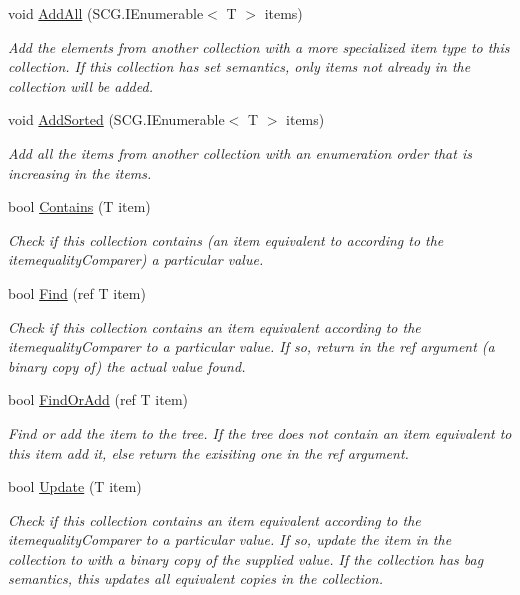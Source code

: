 \begin{DoxyCompactItemize}
void \hyperlink{class_c5_1_1_tree_bag_a12d282c831ea9ef43e39ec92b052729c}{Add\+All} (S\+C\+G.\+I\+Enumerable$<$ T $>$ items)
\begin{DoxyCompactList}\small\item\em Add the elements from another collection with a more specialized item type to this collection. If this collection has set semantics, only items not already in the collection will be added. \end{DoxyCompactList}\item 
void \hyperlink{class_c5_1_1_tree_bag_a79df33146e96a2d3e5bbfd70f804950b}{Add\+Sorted} (S\+C\+G.\+I\+Enumerable$<$ T $>$ items)
\begin{DoxyCompactList}\small\item\em Add all the items from another collection with an enumeration order that is increasing in the items. \end{DoxyCompactList}\item 
bool \hyperlink{class_c5_1_1_tree_bag_ab3325de752c15c458b6c1359a2518e0a}{Contains} (T item)
\begin{DoxyCompactList}\small\item\em Check if this collection contains (an item equivalent to according to the itemequality\+Comparer) a particular value. \end{DoxyCompactList}\item 
bool \hyperlink{class_c5_1_1_tree_bag_a9d195da9dc0c1ccc78c72f1d99b969e6}{Find} (ref T item)
\begin{DoxyCompactList}\small\item\em Check if this collection contains an item equivalent according to the itemequality\+Comparer to a particular value. If so, return in the ref argument (a binary copy of) the actual value found. \end{DoxyCompactList}\item 
bool \hyperlink{class_c5_1_1_tree_bag_a8c43b82821162894db0fc7aa18e7ee6a}{Find\+Or\+Add} (ref T item)
\begin{DoxyCompactList}\small\item\em Find or add the item to the tree. If the tree does not contain an item equivalent to this item add it, else return the exisiting one in the ref argument. \end{DoxyCompactList}\item 
bool \hyperlink{class_c5_1_1_tree_bag_a25b6de50c879cdbb2b82a8510d5b9094}{Update} (T item)
\begin{DoxyCompactList}\small\item\em Check if this collection contains an item equivalent according to the itemequality\+Comparer to a particular value. If so, update the item in the collection to with a binary copy of the supplied value. If the collection has bag semantics, this updates all equivalent copies in the collection. \end{DoxyCompactList}\item 

\end{DoxyCompactItemize}

